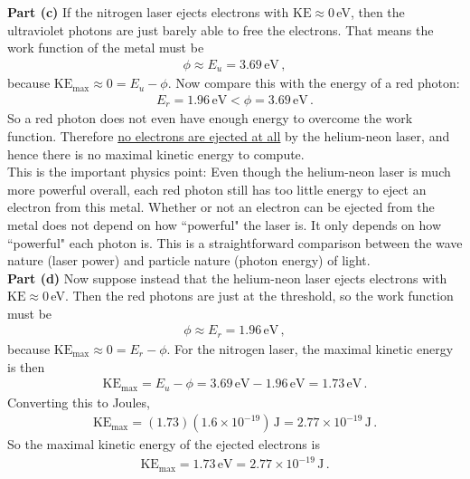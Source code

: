 \documentclass[11pt]{article}
\begin{document}
\noindent\textbf{Part (c)} If the nitrogen laser ejects electrons with $\text{KE}\approx 0$\,eV, then the ultraviolet photons are just barely able to free the electrons. That means the work function of the metal must be
\begin{align*}
\phi \approx E_u = 3.69\,\text{eV}\,,
\end{align*}
because $\text{KE}_{\max} \approx 0 = E_u- \phi$. Now compare this with the energy of a red photon:
\begin{align*}
E_r = 1.96\,\text{eV} < \phi = 3.69\,\text{eV}\,.
\end{align*}
So a red photon does not even have enough energy to overcome the work function. Therefore \underline{no electrons are ejected at all} by the helium-neon laser, and hence there is no maximal kinetic energy to compute.\\

This is the important physics point: Even though the helium-neon laser is much more powerful overall, each red photon still has too little energy to eject an electron from this metal. Whether or not an electron can be ejected from the metal does not depend on how ``powerful" the laser is. It only depends on how ``powerful" each photon is. This is a straightforward comparison between the wave nature (laser power) and particle nature (photon energy) of light.\\

\noindent\textbf{Part (d)} Now suppose instead that the helium-neon laser ejects electrons with $\text{KE}\approx 0$\,eV. Then the red photons are just at the threshold, so the work function must be
\begin{align*}
\phi \approx E_r = 1.96\,\text{eV}\,,
\end{align*}
because $\text{KE}_{\max} \approx 0 =E_r - \phi$. For the nitrogen laser, the maximal kinetic energy is then
\begin{align*}
\text{KE}_{\max} = E_u - \phi = 3.69\,\text{eV} - 1.96\,\text{eV} = 1.73\,\text{eV}\,.
\end{align*}
Converting this to Joules,
\begin{align*}
\text{KE}_{\max} = (1.73)(1.6\times 10^{-19})\,\text{J}
= 2.77\times 10^{-19}\,\text{J}\,.
\end{align*}
So the maximal kinetic energy of the ejected electrons is
\begin{align*}
\text{KE}_{\max} = 1.73\,\text{eV} = 2.77\times 10^{-19}\,\text{J}\,.
\end{align*}
\end{document}
